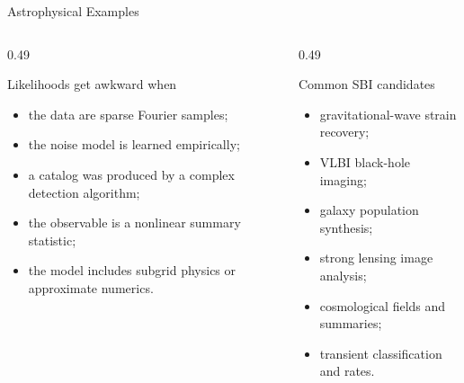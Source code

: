 \documentclass[aspectratio=169,11pt]{beamer}
\newcommand{\tightlist}{\setlength{\itemsep}{0.35em}}
\begin{document}
\begin{frame}{Astrophysical Examples}
  \begin{columns}[T,onlytextwidth]
    \begin{column}{0.49\textwidth}
      \begin{block}{Likelihoods get awkward when}
        \begin{itemize}\tightlist
          \item the data are sparse Fourier samples;
          \item the noise model is learned empirically;
          \item a catalog was produced by a complex detection algorithm;
          \item the observable is a nonlinear summary statistic;
          \item the model includes subgrid physics or approximate numerics.
        \end{itemize}
      \end{block}
    \end{column}
    \begin{column}{0.49\textwidth}
      \begin{block}{Common SBI candidates}
        \begin{itemize}\tightlist
          \item gravitational-wave strain recovery;
          \item VLBI black-hole imaging;
          \item galaxy population synthesis;
          \item strong lensing image analysis;
          \item cosmological fields and summaries;
          \item transient classification and rates.
        \end{itemize}
      \end{block}
    \end{column}
  \end{columns}
\end{frame}
\end{document}
